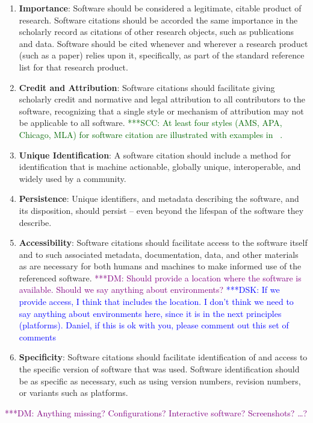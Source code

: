 \documentclass[11pt, oneside]{amsart}
\newcommand{\katznote}[1]{ {\textcolor{blue} { ***DSK: #1 }}}
\newcommand{\scnote}[1]{ {\textcolor{darkgreen} { ***SCC: #1 }}} %
\newcommand{\dmnote}[1]{ {\textcolor{purple} { ***DM: #1 }}} %
\begin{document}
\begin{enumerate}
\item \textbf{Importance}:
Software should be considered a legitimate, citable product of research. Software citations should be accorded the same importance in the scholarly record as citations of other research objects, such as publications and data. Software should be cited whenever and wherever a research product (such as a paper) relies upon it, specifically, as part of the standard reference list for that research product.
\item \textbf{Credit and Attribution}:
Software citations should facilitate giving scholarly credit and normative
and legal attribution to all contributors to the software, recognizing
that a single style or mechanism of attribution may not be applicable to
all software. \scnote{At least four styles (AMS, APA, Chicago, MLA) for
software citation are illustrated with examples in ~\cite{lipson2011cite}.}
\item \textbf{Unique Identification}:
A software citation should include a method for identification that is
machine actionable, globally unique, interoperable, and widely used by
a community.
\item \textbf{Persistence}:
Unique identifiers, and metadata describing the software, and its disposition, should persist -- even beyond the lifespan of the software they describe.
\item \textbf{Accessibility}:
Software citations should facilitate access to the software itself and to such associated metadata, documentation, data, and other materials as are necessary for both humans and machines to make informed use of the referenced software.\dmnote{Should provide a location where the software is available. Should we say anything about environments?} \katznote{If we provide access, I think that includes the location.  I don't think we need to say anything about environments here, since it is in the next principles (platforms).  Daniel, if this is ok with you, please comment out this set of comments}
\item \textbf{Specificity}:
Software citations should facilitate identification of and access to the specific version of software that was used.  Software identification should be as specific as necessary, such as using version numbers, revision numbers, or variants such as platforms.
\end{enumerate}
\dmnote{ Anything missing? Configurations? Interactive software? Screenshots? \ldots ?}
\end{document}

